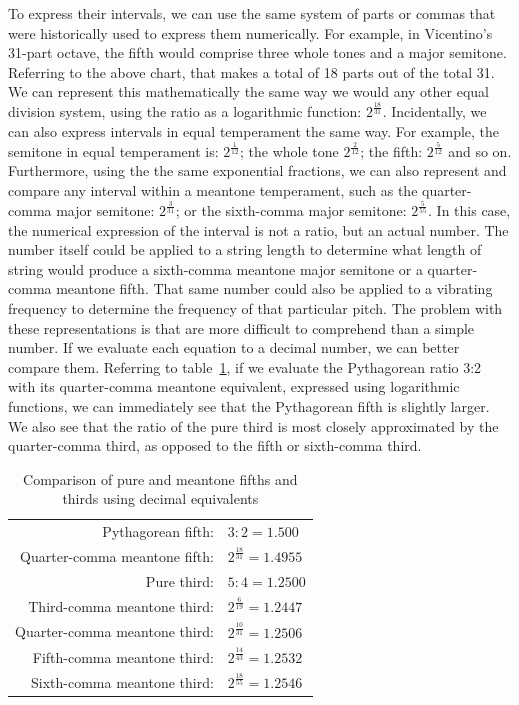 To express their intervals, we can use the same system of parts or commas that were
historically used to express them numerically.  For example, in Vicentino's 31-part
octave, the fifth would comprise three whole tones and a major semitone. Referring to the
above chart, that makes a total of 18 parts out of the total 31.  We can represent this
mathematically the same way we would any other equal division system, using the ratio as a
logarithmic function: $2^\frac{18}{31}$.  Incidentally, we can also express intervals in
equal temperament the same way.  For example, the semitone in equal temperament is: $
2^\frac{1}{12} $; the whole tone $ 2^\frac{2}{12} $; the fifth: $ 2^\frac{5}{12} $ and so
on.  Furthermore, using the the same exponential fractions, we can also represent and
compare any interval within a meantone temperament, such as the quarter-comma major
semitone: $ 2^\frac{3}{31} $; or the sixth-comma major semitone: $ 2^\frac{5}{55} $.  In
this case, the numerical expression of the interval is not a ratio, but an actual number.
The number itself could be applied to a string length to determine what length of string
would produce a sixth-comma meantone major semitone or a quarter-comma meantone fifth.
That same number could also be applied to a vibrating frequency to determine the frequency
of that particular pitch.  The problem with these representations is that are more
difficult to comprehend than a simple number.  If we evaluate each equation to a decimal
number, we can better compare them.  Referring to table~\ref{fifth-comparison}, if we
evaluate the Pythagorean ratio 3:2 with its quarter-comma meantone equivalent, expressed
using logarithmic functions, we can immediately see that the Pythagorean fifth is slightly
larger.  We also see that the ratio of the pure third is most closely approximated by the
quarter-comma third, as opposed to the fifth or sixth-comma third.
\begin{table}[h!]
    \begin{center}
    \begin{tabular}{ r l }
        Pythagorean fifth:            & $ 3:2 = 1.500 $ \\
        Quarter-comma meantone fifth: & $ 2^\frac{18}{31} = 1.4955 $ \\
        \hline
        Pure third:                   & $ 5:4 = 1.2500 $ \\
        Third-comma meantone third:   & $ 2^\frac{6}{19} = 1.2447 $ \\
        Quarter-comma meantone third: & $ 2^\frac{10}{31} = 1.2506 $ \\
        Fifth-comma meantone third:   & $ 2^\frac{14}{43} = 1.2532 $ \\
        Sixth-comma meantone third:   & $ 2^\frac{18}{55} = 1.2546 $ \\
    \end{tabular}
    \end{center}
    \caption{Comparison of pure and meantone fifths and thirds using decimal equivalents}
    \label{fifth-comparison}
\end{table}
